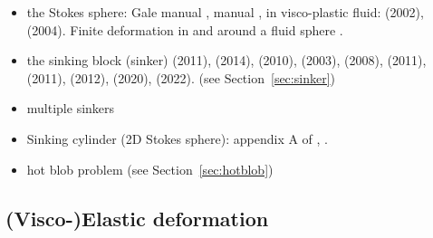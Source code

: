 \begin{itemize}
\item the Stokes sphere: Gale manual \cite{galemanual}, 
      \aspect{} manual \cite{aspectmanual}, 
      in visco-plastic fluid: \textcite{limd02} (2002), 
      \textcite{demj04} (2004). 
      Finite deformation in and around a fluid sphere \cite{sccm88,crud88}.

\item the sinking block (sinker) 
      \textcite{thie11} (2011),
      \textcite{cehg14} (2014),
      \textcite{gery10} (2010),
      \textcite{geyu03} (2003),
      \textcite{mamo08} (2008),
      \textcite{mishin11} (2011),
      \textcite{fumt11} (2011),
      \textcite{maie12} (2012),
      \textcite{sctc20} (2020),
      \textcite{mivg22} (2022). 
      (see Section~\ref{sec:sinker})

\item multiple sinkers \cite{mabl14,mabl15,clhe21,rusg17}

\item Sinking cylinder (2D Stokes sphere): 
      appendix A of \cite{boht08a}, \cite{wali04}.

\item hot blob problem \cite{bugs09,fumt11} (see Section~\ref{sec:hotblob})
\end{itemize}


\subsection{(Visco-)Elastic deformation}

